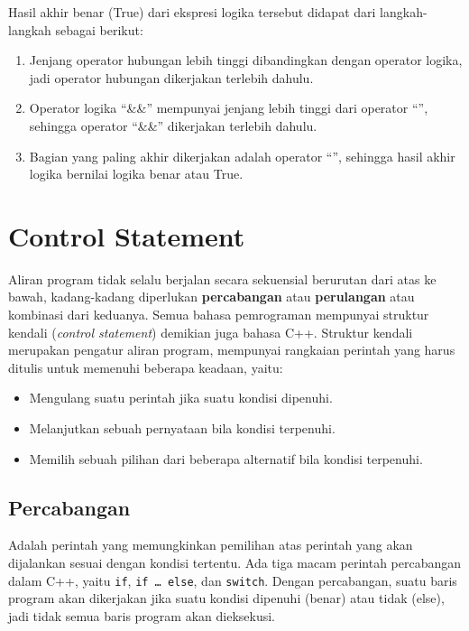 Hasil akhir benar (True) dari ekspresi logika tersebut didapat dari
langkah-langkah sebagai berikut:

\begin{enumerate}


\item
  Jenjang operator hubungan lebih tinggi dibandingkan dengan operator
  logika, jadi operator hubungan dikerjakan terlebih dahulu.
\item
  Operator logika ``\&\&'' mempunyai jenjang lebih tinggi dari operator
  ``\textbar{}\textbar{}'', sehingga operator ``\&\&'' dikerjakan
  terlebih dahulu.
\item
  Bagian yang paling akhir dikerjakan adalah operator
  ``\textbar{}\textbar{}'', sehingga hasil akhir logika bernilai logika
  benar atau True.
\end{enumerate}

\section{Control Statement}\label{control-statement}

Aliran program tidak selalu berjalan secara sekuensial berurutan dari
atas ke bawah, kadang-kadang diperlukan \textbf{percabangan} atau
\textbf{perulangan} atau kombinasi dari keduanya. Semua bahasa
pemrograman mempunyai struktur kendali (\emph{control statement})
demikian juga bahasa C++. Struktur kendali merupakan pengatur aliran
program, mempunyai rangkaian perintah yang harus ditulis untuk memenuhi
beberapa keadaan, yaitu:

\begin{itemize}

\item
  Mengulang suatu perintah jika suatu kondisi dipenuhi.
\item
  Melanjutkan sebuah pernyataan bila kondisi terpenuhi.
\item
  Memilih sebuah pilihan dari beberapa alternatif bila kondisi
  terpenuhi.
\end{itemize}

\subsection{Percabangan}\label{a.-percabangan}

Adalah perintah yang memungkinkan pemilihan atas perintah yang akan
dijalankan sesuai dengan kondisi tertentu. Ada tiga macam perintah
percabangan dalam C++, yaitu \texttt{if}, \texttt{if\ \ldots{}\ else},
dan \texttt{switch}. Dengan percabangan, suatu baris program akan
dikerjakan jika suatu kondisi dipenuhi (benar) atau tidak (else), jadi
tidak semua baris program akan dieksekusi.

